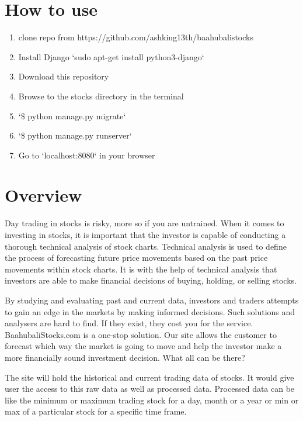 \documentclass{report}
\begin{document}
\section{How to use}
\begin{enumerate}
	\item clone repo from https://github.com/ashking13th/baahubalistocks
	\item Install Django
		`sudo apt-get install python3-django`

	\item Download this repository

	\item Browse to the stocks directory in the terminal

	\item `\$ python manage.py migrate`

	\item `\$ python manage.py runserver`

	\item Go to `localhost:8080` in your browser
\end{enumerate}

\section{ Overview}
Day trading in stocks is risky, more so if you are untrained. When it comes to investing in stocks, it is important that the investor is capable of conducting a thorough technical analysis of stock charts. Technical analysis is used to define the process of forecasting future price movements based on the past price movements within stock charts. It is with the help of technical analysis that investors are able to make financial decisions of buying, holding, or selling stocks. 

By studying and evaluating past and current data, investors and traders attempts to gain an edge in the markets by making informed decisions. Such solutions and analysers are hard to find. If they exist, they cost you for the service.
BaahubaliStocks.com is a one-stop solution. Our site allows the customer to forecast which way the market is going to move and help the investor make a more financially sound investment decision. 
What all can be there?

The site will hold the historical and current trading data of stocks. It would give user the access to this raw data as well as processed data. Processed data can be like the minimum or maximum trading stock for a day, month or a year or min or max of a particular stock for a specific time frame.
\end{document}
